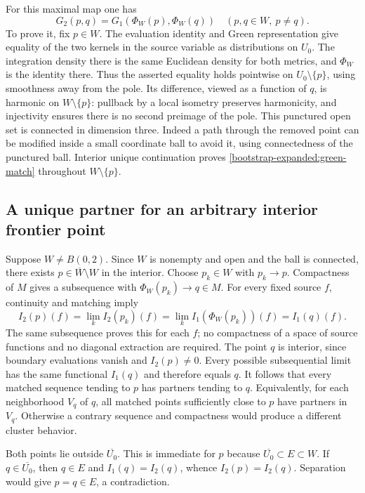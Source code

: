 \documentclass[11pt]{article}
\theoremstyle{definition}
\theoremstyle{remark}
\numberwithin{equation}{section}
\begin{document}
For this maximal map one has
\begin{equation}
 G_2(p,q)=G_1(\Phi_W(p),\Phi_W(q))
                   \quad(p,q\in W,\ p\ne q).
 \label{bootstrap-expanded:green-match}
\end{equation}
To prove it, fix $p\in W$.  The evaluation identity and Green
representation give equality of the two kernels in the source variable
as distributions on $U_0$.  The integration density there is the same
Euclidean density for both metrics, and $\Phi_W$ is the identity
there.  Thus the asserted equality holds pointwise on
$U_0\setminus\{p\}$, using smoothness away from the pole.
Its difference, viewed as a function of $q$, is harmonic on
$W\setminus\{p\}$: pullback by a local isometry preserves harmonicity,
and injectivity ensures there is no second preimage of the pole.
This punctured open set is connected in dimension three.  Indeed a
path through the removed point can be modified inside a small coordinate
ball to avoid it, using connectedness of the punctured ball.  Interior
unique continuation proves \eqref{bootstrap-expanded:green-match} throughout
$W\setminus\{p\}$.

\subsection{A unique partner for an arbitrary interior frontier point}
\label{bootstrap-expanded:partner}

Suppose $W\ne B(0,2)$.  Since $W$ is nonempty and open and the ball
is connected, there exists
$p\in\overline W\setminus W$ in the interior.  Choose $p_k\in W$
with $p_k\to p$.  Compactness of $M$ gives a subsequence with
$\Phi_W(p_k)\to q\in M$.  For every fixed source $f$, continuity
and matching imply
\[
 I_2(p)(f)=\lim_k I_2(p_k)(f)
       =\lim_k I_1(\Phi_W(p_k))(f)=I_1(q)(f).
\]
The same subsequence proves this for each $f$; no compactness of a space
of source functions and no diagonal extraction are required.
The point $q$ is interior, since boundary evaluations vanish and
$I_2(p)\ne0$.  Every possible subsequential limit has the same
functional $I_1(q)$ and therefore equals $q$.  It follows that every
matched sequence tending to $p$ has partners tending to $q$.
Equivalently, for each neighborhood $V_q$ of $q$, all matched points
sufficiently close to $p$ have partners in $V_q$.  Otherwise a contrary
sequence and compactness would produce a different cluster behavior.

Both points lie outside $\overline{U_0}$.  This is immediate for $p$
because $\overline{U_0}\subset E\subset W$.  If
$q\in\overline{U_0}$, then $q\in E$ and
$I_1(q)=I_2(q)$, whence $I_2(p)=I_2(q)$.  Separation would give
$p=q\in E$, a contradiction.
\end{document}
